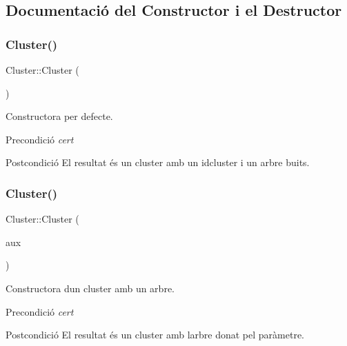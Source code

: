 \subsection{Documentació del Constructor i el Destructor}
\mbox{\label{class_cluster_aee7feb1d599d4c8fda6c3ee83e86ba81}} 
\subsubsection{\texorpdfstring{Cluster()}{Cluster()}\hspace{0.1cm}{\footnotesize\ttfamily [1/2]}}
{\footnotesize\ttfamily Cluster\+::\+Cluster (\begin{DoxyParamCaption}{ }\end{DoxyParamCaption})}



Constructora per defecte. 

\begin{DoxyPrecond}{Precondició}
{\itshape cert} 
\end{DoxyPrecond}
\begin{DoxyPostcond}{Postcondició}
El resultat és un cluster amb un idcluster i un arbre buits. 
\end{DoxyPostcond}
\mbox{\label{class_cluster_a2559ebf853192492bcae2cd68f54e5a7}} 
\subsubsection{\texorpdfstring{Cluster()}{Cluster()}\hspace{0.1cm}{\footnotesize\ttfamily [2/2]}}
{\footnotesize\ttfamily Cluster\+::\+Cluster (\begin{DoxyParamCaption}\item[{Bin\+Tree$<$ \hyperlink{class_especie}{Especie} $>$}]{aux }\end{DoxyParamCaption})}



Constructora d\textquotesingle{}un cluster amb un arbre. 

\begin{DoxyPrecond}{Precondició}
{\itshape cert} 
\end{DoxyPrecond}
\begin{DoxyPostcond}{Postcondició}
El resultat és un cluster amb l\textquotesingle{}arbre donat pel paràmetre. 
\end{DoxyPostcond}


